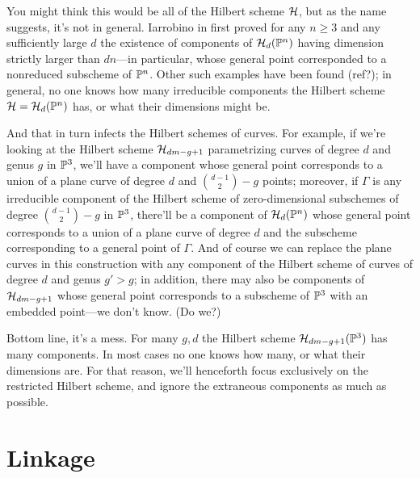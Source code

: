You might think this would be all of the Hilbert scheme ${\cal H}$, but as the name suggests, it's not in general. Iarrobino in \cite{Iarrobino} first proved  for any $n \geq 3$ and any sufficiently large $d$ the existence of components of ${\cal H}_d({\mathbb P}^n)$ having dimension strictly larger than $dn$---in particular, whose general point corresponded to a nonreduced subscheme of ${\mathbb P}^n$. Other such examples have been found (ref?); in general, no one knows how many irreducible components the Hilbert scheme ${\cal H} = {\cal H}_d({\mathbb P}^n)$ has, or what their dimensions might be.

And that in turn infects the Hilbert schemes of curves. For example, if we're looking at the Hilbert scheme ${\cal H}_{dm-g+1}$ parametrizing curves of degree $d$ and genus $g$ in ${\mathbb P}^3$, we'll have a component whose general point corresponds to a union of a plane curve of degree $d$ and $\binom{d-1}{2} - g$ points; moreover, if $\Gamma$ is any irreducible component of the Hilbert scheme of zero-dimensional subschemes of degree $\binom{d-1}{2} - g$ in ${\mathbb P}^3$, there'll be a component of ${\cal H}_d({\mathbb P}^n)$ whose  general point corresponds to a union of a plane curve of degree $d$ and the subscheme corresponding to a general point of $\Gamma$. And of course we can replace the plane curves in this construction with any component of the Hilbert scheme of curves of degree $d$ and genus $g' > g$; in addition, there may also be components of ${\cal H}_{dm-g+1}$ whose general point corresponds to a subscheme of ${\mathbb P}^3$ with an embedded point---we don't know. (Do we?)

Bottom line, it's a mess. For many $g,d$ the Hilbert scheme ${\cal H}_{dm-g+1}({\mathbb P}^3)$ has many components. In most cases no one knows how many, or what their dimensions are.
For that reason, we'll henceforth focus exclusively on the restricted Hilbert scheme, and ignore the extraneous components as much as possible.

\section{Linkage} \label{SLinkage}

